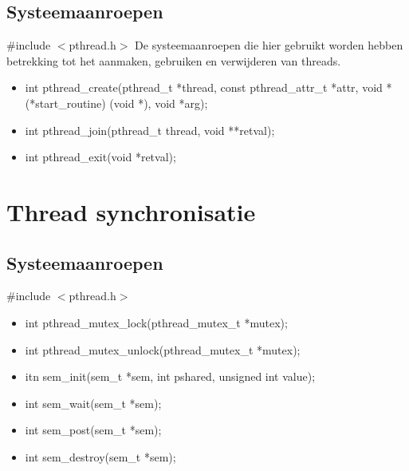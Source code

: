 \documentclass{report}
\begin{document}
\section{Systeemaanroepen}
\#include $<$pthread.h$>$
\newline
De systeemaanroepen die hier gebruikt worden hebben betrekking tot het aanmaken, gebruiken en verwijderen van threads.
\begin{itemize}
	\item int pthread\_create(pthread\_t *thread, const pthread\_attr\_t *attr, void *(*start\_routine) (void *), void *arg);
	\item int pthread\_join(pthread\_t thread, void **retval);
	\item int pthread\_exit(void *retval);
\end{itemize}


\chapter{Thread synchronisatie}

\section{Systeemaanroepen}
\#include $<$pthread.h$>$
\newline
\begin{itemize}
	\item int pthread\_mutex\_lock(pthread\_mutex\_t *mutex);
	\item int pthread\_mutex\_unlock(pthread\_mutex\_t *mutex);
	\item itn sem\_init(sem\_t *sem, int pshared, unsigned int value);
	\item int sem\_wait(sem\_t *sem);
	\item int sem\_post(sem\_t *sem);
	\item int sem\_destroy(sem\_t *sem);
\end{itemize}
\end{document}
